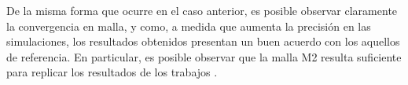 De la misma forma que ocurre en el caso anterior, es posible observar claramente la convergencia en malla, y como, a medida que aumenta la precisión en las simulaciones, los resultados obtenidos presentan un buen acuerdo con los aquellos de referencia. En particular, es posible observar que la malla M2 resulta suficiente para replicar los resultados de los trabajos \cite{moser1999, kawamura2000dns}.

\begin{figure}[H]
 \centering


\end{figure}
